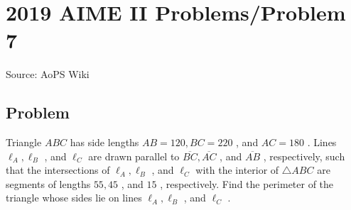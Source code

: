 \documentclass[12pt]{article}
\begin{document}
\section*{{2019 AIME II Problems/Problem 7}}
Source: AoPS Wiki

\subsection*{Problem}
Triangle $ABC$ has side lengths $AB=120,BC=220$ , and $AC=180$ . Lines $\ell_A,\ell_B$ , and $\ell_C$ are drawn parallel to $\overline{BC},\overline{AC}$ , and $\overline{AB}$ , respectively, such that the intersections of $\ell_A,\ell_B$ , and $\ell_C$ with the interior of $\triangle ABC$ are segments of lengths $55,45$ , and $15$ , respectively. Find the perimeter of the triangle whose sides lie on lines $\ell_A,\ell_B$ , and $\ell_C$ .
\end{document}
